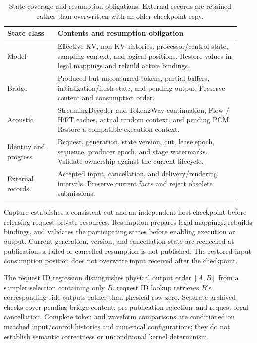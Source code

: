 \begin{table}[tbp]
    \centering
    \small
    \setlength{\tabcolsep}{5pt}
    \caption{
        State coverage and resumption obligations.
        External records are retained rather than overwritten
        with an older checkpoint copy.
    }
    \label{tab:app_state_contract}
    \begin{tabular}{
        @{}
        >{\raggedright\arraybackslash}p{0.20\linewidth}
        >{\raggedright\arraybackslash}p{0.73\linewidth}
        @{}
    }
        \toprule
        State class & Contents and resumption obligation \\
        \midrule
        Model
        & Effective KV, non-KV histories, processor/control state,
          sampling context, and logical positions.
          Restore values in legal mappings and rebuild active bindings. \\
        Bridge
        & Produced but unconsumed tokens, partial buffers,
          initialization/flush state, and pending output.
          Preserve content and consumption order. \\
        Acoustic
        & StreamingDecoder and Token2Wav continuation,
          Flow / HiFT caches, actual random context, and pending PCM.
          Restore a compatible execution context. \\
        Identity and progress
        & Request, generation, state version, cut, lease epoch,
          sequence, producer epoch, and stage watermarks.
          Validate ownership against the current lifecycle. \\
        External records
        & Accepted input, cancellation, and delivery/rendering intervals.
          Preserve current facts and reject obsolete submissions. \\
        \bottomrule
    \end{tabular}
\end{table}

Capture establishes a consistent cut and an independent host
checkpoint before releasing request-private resources.
Resumption prepares legal mappings, rebuilds bindings, and validates
the participating states before enabling execution or output.
Current generation, version, and cancellation state are rechecked
at publication; a failed or cancelled resumption is not published.
The restored input-consumption position does not overwrite input
received after the checkpoint.

The request ID regression distinguishes physical output order
$[A,B]$ from a sampler selection containing only $B$.
request ID lookup retrieves $B$'s corresponding side outputs rather
than physical row zero.
Separate archived checks cover pending bridge content,
pre-publication rejection, and request-local cancellation.
Complete token and waveform comparisons are conditioned on matched
input/control histories and numerical configurations; they do not
establish semantic correctness or unconditional kernel determinism.

